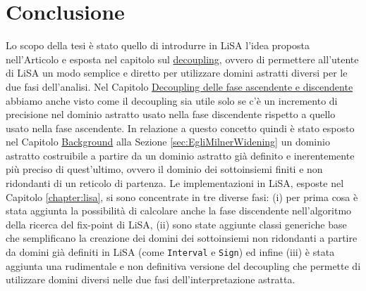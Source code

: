 \chapter{Conclusione}\label{chapter:conclusioni} %
Lo scopo della tesi è stato quello di introdurre in LiSA l'idea proposta nell'Articolo \cite{DBLP:conf/aplas/ArceriMZ22} e esposta nel capitolo sul \hyperref[chapter:decoupling]{decoupling}, ovvero di permettere all'utente di LiSA un modo semplice e diretto per utilizzare domini astratti diversi per le due fasi dell'analisi. Nel Capitolo \hyperref[chapter:decoupling]{Decoupling delle fase ascendente e discendente} abbiamo anche visto come il decoupling sia utile solo se c'è un incremento di precisione nel dominio  astratto usato nella fase discendente rispetto a quello usato nella fase ascendente. In relazione a questo concetto quindi è stato esposto nel Capitolo \hyperref[chapter:background]{Background} alla Sezione \ref{sec:EgliMilnerWidening} un dominio astratto costruibile a partire da un dominio astratto già definito e inerentemente più preciso di quest'ultimo, ovvero il dominio dei sottoinsiemi finiti e non ridondanti di un reticolo di partenza. Le implementazioni in LiSA, esposte nel Capitolo \ref{chapter:lisa}, si sono concentrate in tre diverse fasi: (i) per prima cosa è stata aggiunta la possibilità di calcolare anche la fase discendente nell'algoritmo della ricerca del fix-point di LiSA, (ii) sono state aggiunte classi generiche base che semplificano la creazione dei domini dei sottoinsiemi non ridondanti a partire da domini già definiti in LiSA (come \texttt{Interval} e \texttt{Sign}) ed infine (iii) è stata aggiunta una rudimentale e non definitiva versione del decoupling che permette di utilizzare domini diversi nelle due fasi dell'interpretazione astratta.

